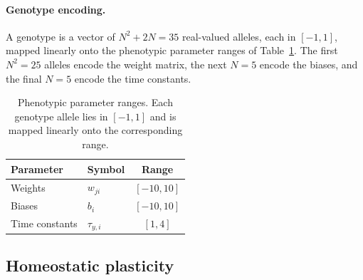 \paragraph{Genotype encoding.}
A genotype is a vector of $N^2 + 2N = 35$ real-valued alleles, each in
$[-1, 1]$, mapped linearly onto the phenotypic parameter ranges of
Table~\ref{tab:param-ranges}. The first $N^2 = 25$ alleles encode the weight
matrix, the next $N = 5$ encode the biases, and the final $N = 5$ encode the
time constants.

\begin{table}[t]
  \centering
  \caption{Phenotypic parameter ranges. Each genotype allele lies in $[-1,1]$
  and is mapped linearly onto the corresponding range.}
  \label{tab:param-ranges}
  \begin{tabular}{llc}
    \toprule
    Parameter & Symbol & Range \\
    \midrule
    Weights        & $w_{ji}$    & $[-10, 10]$ \\
    Biases         & $b_i$       & $[-10, 10]$ \\
    Time constants & $\tau_{y,i}$ & $[1, 4]$ \\
    \bottomrule
  \end{tabular}
\end{table}

\subsection{Homeostatic plasticity}
\label{sec:methods:hp}


